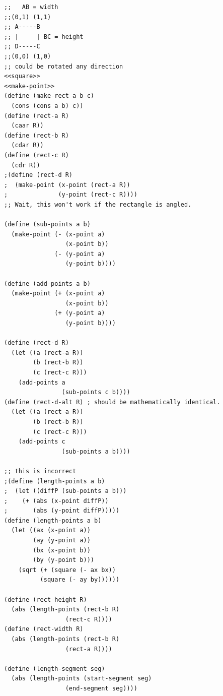 \documentclass[final,fleqn,titlepage,twoside]{article}
\begin{document}
\begin{verbatim}
;;   AB = width
;;(0,1) (1,1)
;; A-----B
;; |     | BC = height
;; D-----C
;;(0,0) (1,0)
;; could be rotated any direction
<<square>>
<<make-point>>
(define (make-rect a b c)
  (cons (cons a b) c))
(define (rect-a R)
  (caar R))
(define (rect-b R)
  (cdar R))
(define (rect-c R)
  (cdr R))
;(define (rect-d R)
;  (make-point (x-point (rect-a R))
;              (y-point (rect-c R))))
;; Wait, this won't work if the rectangle is angled.

(define (sub-points a b)
  (make-point (- (x-point a)
                 (x-point b))
              (- (y-point a)
                 (y-point b))))

(define (add-points a b)
  (make-point (+ (x-point a)
                 (x-point b))
              (+ (y-point a)
                 (y-point b))))

(define (rect-d R)
  (let ((a (rect-a R))
        (b (rect-b R))
        (c (rect-c R)))
    (add-points a
                (sub-points c b))))
(define (rect-d-alt R) ; should be mathematically identical.
  (let ((a (rect-a R))
        (b (rect-b R))
        (c (rect-c R)))
    (add-points c
                (sub-points a b))))

;; this is incorrect
;(define (length-points a b)
;  (let ((diffP (sub-points a b)))
;    (+ (abs (x-point diffP))
;       (abs (y-point diffP)))))
(define (length-points a b)
  (let ((ax (x-point a))
        (ay (y-point a))
        (bx (x-point b))
        (by (y-point b)))
    (sqrt (+ (square (- ax bx))
          (square (- ay by))))))

(define (rect-height R)
  (abs (length-points (rect-b R)
                 (rect-c R))))
(define (rect-width R)
  (abs (length-points (rect-b R)
                 (rect-a R))))

(define (length-segment seg)
  (abs (length-points (start-segment seg)
                 (end-segment seg))))
\end{verbatim}
\end{document}
